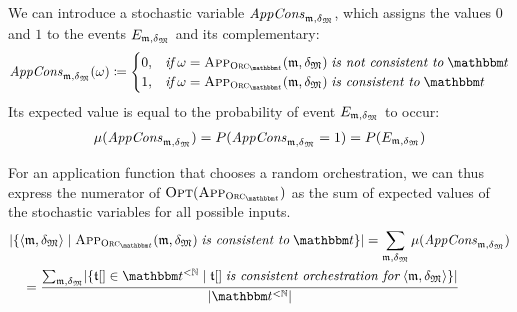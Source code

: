 We can introduce a stochastic variable $\mathvariable{AppCons}_{\modeltuple{m},\changetuple{\metamodeltuple{M}}}$, which assigns the values $0$ and $1$ to the events $E_{\modeltuple{m},\changetuple{\metamodeltuple{M}}}$ and its complementary:
\begin{align*}
    \mathvariable{AppCons}_{\modeltuple{m},\changetuple{\metamodeltuple{M}}}(\omega) \equalsperdefinition 
    \begin{cases}
        0, & \ifmath \omega = \appfunction{\orcfunction{\transformationset{T}}}(\modeltuple{m}, \changetuple{\metamodeltuple{M}}) \mathtextspacearound{is not consistent to} \transformationset{T} \\
        1, & \ifmath \omega = \appfunction{\orcfunction{\transformationset{T}}}(\modeltuple{m}, \changetuple{\metamodeltuple{M}}) \mathtextspacearound{is consistent to} \transformationset{T}
    \end{cases}
\end{align*}
Its expected value is equal to the probability of event $E_{\modeltuple{m},\changetuple{\metamodeltuple{M}}}$ to occur:
\begin{align*}
    \mu(\mathvariable{AppCons}_{\modeltuple{m},\changetuple{\metamodeltuple{M}}}) = P(\mathvariable{AppCons}_{\modeltuple{m},\changetuple{\metamodeltuple{M}}} = 1) = P(E_{\modeltuple{m},\changetuple{\metamodeltuple{M}}})
\end{align*}

For an application function that chooses a random orchestration, we can thus express the numerator of $\function{Opt}(\appfunction{\orcfunction{\transformationset{T}}})$ as the sum of expected values of the stochastic variables for all possible inputs.
\begin{align*}
    &
    \abs{\setted{\tupled{\modeltuple{m},\changetuple{\metamodeltuple{M}}} \mid \appfunction{\orcfunction{\transformationset{T}}}(\modeltuple{m}, \changetuple{\metamodeltuple{M}}) \mathtextspacearound{is consistent to} \transformationset{T}}} = \sum_{\modeltuple{m},\changetuple{\metamodeltuple{M}}} \mu(\mathvariable{AppCons}_{\modeltuple{m},\changetuple{\metamodeltuple{M}}}) \\
    & \formulaskip
    = \frac{
        \sum_{\modeltuple{m},\changetuple{\metamodeltuple{M}}} \abs{\setted{\sequence{\transformation{t}} \in \transformationset{T}^{< \mathbb{N}} \mid \sequence{\transformation{t}} \mathtextspacearound{is consistent orchestration for} \tupled{\modeltuple{m}, \changetuple{\metamodeltuple{M}}}}}
    }{
        \abs{\transformationset{T}^{< \mathbb{N}}}
    }
\end{align*}

